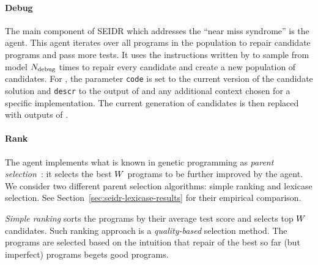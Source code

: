 






\paragraph{Debug}

The main component of SEIDR which addresses the ``near miss syndrome'' is the \debug{} agent.  
This agent iterates over all programs in the population to repair candidate programs and pass more tests. 
It uses the instructions written by \instruct{} to sample from \debugmodel{} model $N_\text{debug}{}$ times
to repair every candidate and create a new population of \treearity{} candidates.
For \debugmodel{}, the parameter \texttt{code} is set to the current version of the candidate solution and \texttt{descr} to the output of \instruct{} and any additional context chosen for a specific implementation.
The current generation of candidates is then replaced with \treearity{} outputs of \debug{}.

\paragraph{Rank}

The \rank{} agent implements what is known in genetic programming as \emph{parent selection}~\cite{koza1994:genetic}: it selects the best $W{}$ programs to be further improved by the \debug{} agent.
We consider two different parent selection algorithms: simple ranking and lexicase selection. 
See Section~\ref{sec:seidr-lexicase-results} for their empirical comparison.

\emph{Simple ranking} sorts the programs by their average test score and selects top $W{}$ candidates. 
Such ranking approach is a \emph{quality-based} selection method.
The programs are selected based on the intuition that repair of the best so far (but imperfect) programs begets good programs.

